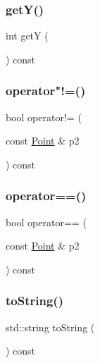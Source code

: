 \subsubsection{\texorpdfstring{get\+Y()}{getY()}}
{\footnotesize\ttfamily int getY (\begin{DoxyParamCaption}{ }\end{DoxyParamCaption}) const}

\mbox{\label{classPoint_ad62a7cee20e8e65bdf44b395d3df3e1b}} 
\subsubsection{\texorpdfstring{operator"!=()}{operator!=()}}
{\footnotesize\ttfamily bool operator!= (\begin{DoxyParamCaption}\item[{const \mbox{\hyperlink{classPoint}{Point}} \&}]{p2 }\end{DoxyParamCaption}) const}

\mbox{\label{classPoint_a66555fdca04ab3b9217ba2ed259be2b9}} 
\subsubsection{\texorpdfstring{operator==()}{operator==()}}
{\footnotesize\ttfamily bool operator== (\begin{DoxyParamCaption}\item[{const \mbox{\hyperlink{classPoint}{Point}} \&}]{p2 }\end{DoxyParamCaption}) const}

\mbox{\label{classPoint_a1fe5121d6528fdea3f243321b3fa3a49}} 
\subsubsection{\texorpdfstring{to\+String()}{toString()}}
{\footnotesize\ttfamily std\+::string to\+String (\begin{DoxyParamCaption}{ }\end{DoxyParamCaption}) const}

